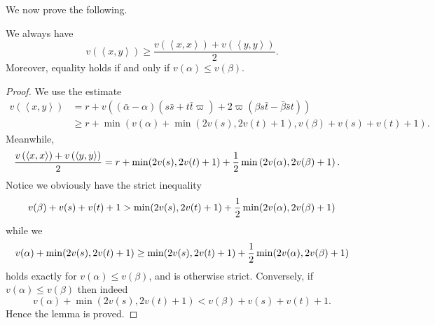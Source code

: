 We now prove the following.
\begin{lemma}
  We always have
  \[
    v\left( \left\langle x,y \right\rangle \right) \ge
    \frac{v\left( \left\langle x,x \right\rangle \right)
      + v\left( \left\langle y,y \right\rangle \right)}{2}.
  \]
  Moreover, equality holds if and only if $v(\alpha) \le v(\beta)$.
\end{lemma}
\begin{proof}
  We use the estimate
  \begin{align*}
    v\left( \left\langle x,y \right\rangle  \right)
    &= r + v\left(
      (\bar\alpha - \alpha)(s \bar s + t \bar t \varpi)
      + 2\varpi(\beta s \bar t - \bar\beta \bar s t) \right) \\
    &\ge r + \min(
      v(\alpha) + \min(2v(s), 2v(t)+1),
      v(\beta) + v(s) + v(t) + 1
    ).
  \end{align*}
  Meanwhile,
  \begin{align*}
    \frac{v\left( \left\langle x,x \right\rangle \right) + v \left( \left\langle y,y \right\rangle \right)}{2}
    &= r + \min(2v(s), 2v(t)+1) + \frac{1}{2} \min\left( 2v(\alpha), 2v(\beta) + 1 \right).
  \end{align*}
  Notice we obviously have the strict inequality
  \[ v(\beta) + v(s) + v(t) + 1 > \min(2v(s), 2v(t)+1)
    + \frac{1}{2} \min(2v(\alpha), 2v(\beta)+1) \]
  while we
  \[ v(\alpha) + \min(2v(s), 2v(t)+1)
    \ge \min(2v(s), 2v(t)+1) + \frac{1}{2} \min(2v(\alpha), 2v(\beta)+1) \]
  holds exactly for $v(\alpha) \le v(\beta)$, and is otherwise strict.
  Conversely, if $v(\alpha) \le v(\beta)$ then indeed
  \[ v(\alpha) + \min(2v(s), 2v(t)+1) < v(\beta) + v(s) + v(t) + 1. \]
  Hence the lemma is proved.
\end{proof}

